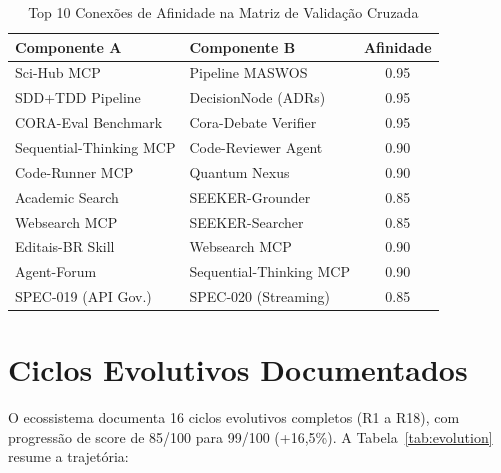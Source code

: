 \begin{table}[H]
\centering
\caption{Top 10 Conexões de Afinidade na Matriz de Validação Cruzada}
\label{tab:affinity}
\begin{tabular}{p{5.5cm}p{5.5cm}c}
\toprule
\textbf{Componente A} & \textbf{Componente B} & \textbf{Afinidade} \\
\midrule
Sci-Hub MCP & Pipeline MASWOS & 0.95 \\
SDD+TDD Pipeline & DecisionNode (ADRs) & 0.95 \\
CORA-Eval Benchmark & Cora-Debate Verifier & 0.95 \\
Sequential-Thinking MCP & Code-Reviewer Agent & 0.90 \\
Code-Runner MCP & Quantum Nexus & 0.90 \\
Academic Search & SEEKER-Grounder & 0.85 \\
Websearch MCP & SEEKER-Searcher & 0.85 \\
Editais-BR Skill & Websearch MCP & 0.90 \\
Agent-Forum & Sequential-Thinking MCP & 0.90 \\
SPEC-019 (API Gov.) & SPEC-020 (Streaming) & 0.85 \\
\bottomrule
\end{tabular}
\end{table}

\section{Ciclos Evolutivos Documentados}

O ecossistema documenta 16 ciclos evolutivos completos (R1 a R18), com progressão de score de 85/100 para 99/100 (+16,5\%). A Tabela~\ref{tab:evolution} resume a trajetória:

